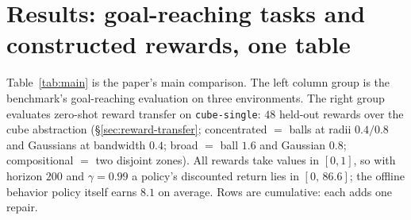 \documentclass{article}
\begin{document}
\section{Results: goal-reaching tasks and constructed rewards, one table}
\label{sec:results}

Table~\ref{tab:main} is the paper's main comparison. The left column group is
the benchmark's goal-reaching evaluation on three environments. The right group
evaluates zero-shot reward transfer on \texttt{cube-single}: $48$ held-out
rewards over the cube abstraction (\S\ref{sec:reward-transfer};
concentrated $=$ balls at radii $0.4/0.8$ and Gaussians at bandwidth $0.4$;
broad $=$ ball $1.6$ and Gaussian $0.8$; compositional $=$ two disjoint zones).
All rewards take values in $[0,1]$, so with horizon $200$ and $\gamma=0.99$ a
policy's discounted return lies in $[0,\,86.6]$; the offline behavior policy
itself earns $8.1$ on average. Rows are cumulative: each adds one repair.
\end{document}
